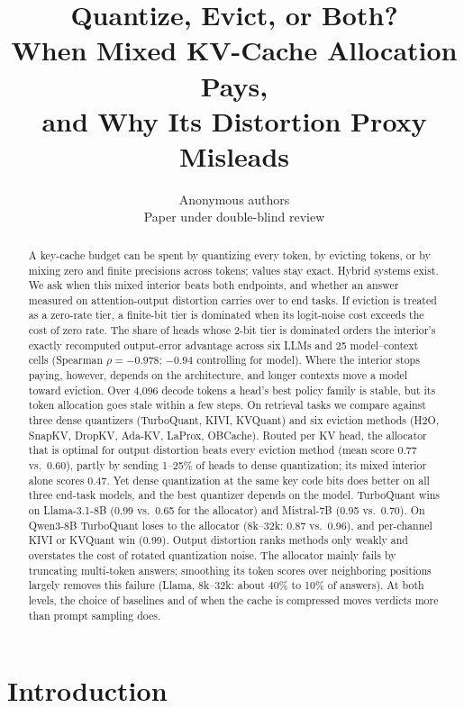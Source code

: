 \documentclass{article}
\title{Quantize, Evict, or Both?\\
When Mixed KV-Cache Allocation Pays,\\
and Why Its Distortion Proxy Misleads}
\author{Anonymous authors \\ Paper under double-blind review}
\theoremstyle{definition}
\begin{document}
\maketitle

\begin{abstract}
A key-cache budget can be spent by quantizing every token, by evicting tokens, or by mixing zero and finite precisions across tokens; values stay exact.  Hybrid systems exist.  We ask when this mixed interior beats both endpoints, and whether an answer measured on attention-output distortion carries over to end tasks.  If eviction is treated as a zero-rate tier, a finite-bit tier is dominated when its logit-noise cost exceeds the cost of zero rate.  The share of heads whose 2-bit tier is dominated orders the interior's exactly recomputed output-error advantage across six LLMs and 25 model--context cells (Spearman $\rho=-0.978$; $-0.94$ controlling for model).  Where the interior stops paying, however, depends on the architecture, and longer contexts move a model toward eviction.  Over 4,096 decode tokens a head's best policy family is stable, but its token allocation goes stale within a few steps.  On retrieval tasks we compare against three dense quantizers (TurboQuant, KIVI, KVQuant) and six eviction methods (H2O, SnapKV, DropKV, Ada-KV, LaProx, OBCache).  Routed per KV head, the allocator that is optimal for output distortion beats every eviction method (mean score 0.77 vs.\ 0.60), partly by sending 1--25\% of heads to dense quantization; its mixed interior alone scores 0.47.
Yet dense quantization at the same key code bits does better on all three end-task models, and the best quantizer depends on the model.  TurboQuant wins on Llama-3.1-8B (0.99 vs.\ 0.65 for the allocator) and Mistral-7B (0.95 vs.\ 0.70).  On Qwen3-8B TurboQuant loses to the allocator (8k--32k: 0.87 vs.\ 0.96), and per-channel KIVI or KVQuant win (0.99).  Output distortion ranks methods only weakly and overstates the cost of rotated quantization noise.  The allocator mainly fails by truncating multi-token answers; smoothing its token scores over neighboring positions largely removes this failure (Llama, 8k--32k: about 40\% to 10\% of answers).  At both levels, the choice of baselines and of when the cache is compressed moves verdicts more than prompt sampling does.
\end{abstract}

\section{Introduction}
\label{sec:intro}
\end{document}
